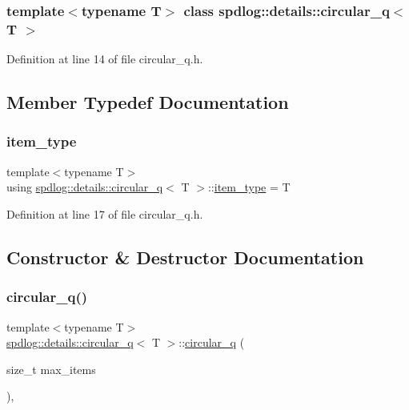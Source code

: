 \subsubsection*{template$<$typename T$>$\newline
class spdlog\+::details\+::circular\+\_\+q$<$ T $>$}



Definition at line 14 of file circular\+\_\+q.\+h.



\subsection{Member Typedef Documentation}
\mbox{\label{classspdlog_1_1details_1_1circular__q_a50926d98e20ee48b70d4b66d99895e97}} 
\subsubsection{\texorpdfstring{item\+\_\+type}{item\_type}}
{\footnotesize\ttfamily template$<$typename T$>$ \\
using \hyperlink{classspdlog_1_1details_1_1circular__q}{spdlog\+::details\+::circular\+\_\+q}$<$ T $>$\+::\hyperlink{classspdlog_1_1details_1_1circular__q_a50926d98e20ee48b70d4b66d99895e97}{item\+\_\+type} =  T}



Definition at line 17 of file circular\+\_\+q.\+h.



\subsection{Constructor \& Destructor Documentation}
\mbox{\label{classspdlog_1_1details_1_1circular__q_ab0aae072dd38824fee65ed9d48568c2f}} 
\subsubsection{\texorpdfstring{circular\+\_\+q()}{circular\_q()}}
{\footnotesize\ttfamily template$<$typename T$>$ \\
\hyperlink{classspdlog_1_1details_1_1circular__q}{spdlog\+::details\+::circular\+\_\+q}$<$ T $>$\+::\hyperlink{classspdlog_1_1details_1_1circular__q}{circular\+\_\+q} (\begin{DoxyParamCaption}\item[{size\+\_\+t}]{max\+\_\+items }\end{DoxyParamCaption})\hspace{0.3cm}{\ttfamily [inline]}, {\ttfamily [explicit]}}



